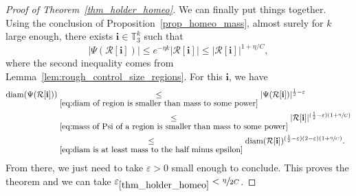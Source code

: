 \documentclass[JEP,XML,SOM,Unicode,NoFloatCountersInSection,published]{cedram}
\newcommand{\Rr}{\mathcal{R}}
\newcommand{\ii}{\mathbf{i}}
\newcommand{\diam}{\mathrm{diam}}
\let\eps\varepsilon
\theoremstyle{plain}
\theoremstyle{definition}
\begin{document}
\begin{proof}[Proof of Theorem~\ref{thm_holder_homeo}]
We can finally put things together.
Using the conclusion of Proposition~\ref{prop_homeo_mass}, almost surely for $k$ large enough, there exists $\ii \in \mathbb{T}_3^k$ such that\vspace*{-3pt}
\begin{equation}
\label{eq:mass of Psi of a region is smaller than mass to some power}
\left| \Psi \left( \Rr[\ii] \right) \right| \leq e^{-\eta k} \left| \Rr[\ii] \right| \leq \left| \Rr[\ii] \right|^{1+\eta/C},
\end{equation}
where the second inequality comes from Lemma~\ref{lem:rough_control_size_regions}.
For this $\ii$, we have\vspace*{-3pt}
\begin{align*}
\diam(\Psi(\Rr[\ii ])) &\underset{\eqref{eq:diam of region is smaller than mass to some power}}{\leq} |\Psi(\Rr[\ii ])|^{\frac{1}{2}-\eps}\\
&\underset{\eqref{eq:mass of Psi of a region is smaller than mass to some power}}{\leq} |\Rr[\ii ]|^{(\frac{1}{2}-\eps)(1+\sfrac{\eta}{C})}\\
&\underset{\eqref{eq:diam is at least mass to the half minus epsilon}}{\leq} \diam(\Rr[\ii ])^{(\frac{1}{2}-\eps)(2-\eps)(1+\sfrac{\eta}{C})}.
\end{align*}
From there, we just need to take $\eps>0$ small enough to conclude. This proves the theorem and we can take $\eps_{\ref{thm_holder_homeo}}<\sfrac{\eta}{2C}$.
\end{proof}
\end{document}
